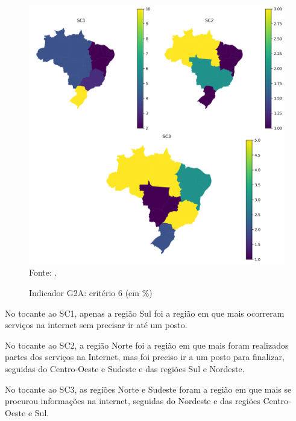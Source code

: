 \begin{figure}[H]
	\centering
	\caption{Indicador G2A: critério 6 (em \%)}
	\includegraphics[width=1\linewidth]{figuras/mapa_coropletico_tic_domicilios_2024_g2a_6.png}
	\label{fig:mapa_coropletico_tic_domicilios_2024_g2a_6}
	\footnotesize{Fonte: \cite{tic_domicilios_2024_g2a}.}
\end{figure}

No tocante ao SC1, apenas a região Sul foi a região em que mais ocorreram serviços na internet sem precisar ir até um posto.

No tocante ao SC2, a região Norte foi a região em que mais foram realizados partes dos serviços na Internet, mas foi preciso ir a um posto para finalizar, seguidas do Centro-Oeste e Sudeste e das regiões Sul e Nordeste.

No tocante ao SC3, as regiões Norte e Sudeste foram a região em que mais se procurou informações na internet, seguidas do Nordeste e das regiões Centro-Oeste e Sul.

